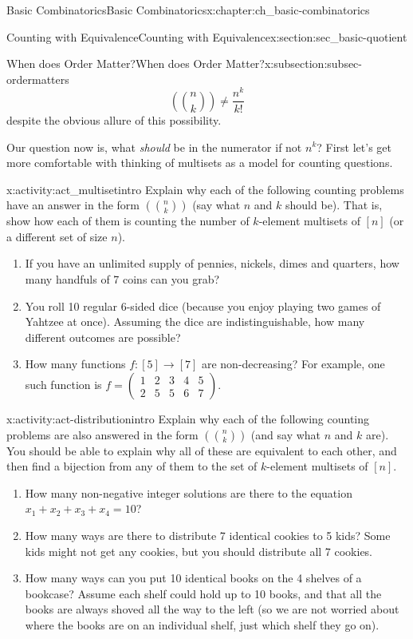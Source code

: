 \documentclass[oneside,10pt,]{book}
\numberwithin{equation}{chapter}
\newcommand{\mchoose}[2]{\left(\!\binom{#1}{#2}\!\right)}
\newcommand{\twoline}[2]{\begin{pmatrix}#1 \\ #2 \end{pmatrix}}
\newcommand{\amp}{&}
\begin{document}
\begin{chapterptx}{Basic Combinatorics}{}{Basic Combinatorics}{}{}{x:chapter:ch_basic-combinatorics}
\begin{sectionptx}{Counting with Equivalence}{}{Counting with Equivalence}{}{}{x:section:sec_basic-quotient}
\begin{subsectionptx}{When does Order Matter?}{}{When does Order Matter?}{}{}{x:subsection:subsec-ordermatters}
\begin{equation*}
\mchoose{n}{k} \ne \frac{n^k}{k!}
\end{equation*}
despite the obvious allure of this possibility.%
\par
Our question now is, what \emph{should} be in the numerator if not \(n^k\)?  First let's get more comfortable with thinking of multisets as a model for counting questions.%
\begin{activity}{}{x:activity:act_multisetintro}%
Explain why each of the following counting problems have an answer in the form \(\mchoose{n}{k}\) (say what \(n\) and \(k\) should be).  That is, show how each of them is counting the number of \(k\)-element multisets of \([n]\) (or a different set of size \(n\)).%
\begin{enumerate}[font=\bfseries,label=(\alph*),ref=\alph*]
\item{}If you have an unlimited supply of pennies, nickels, dimes and quarters, how many handfuls of 7 coins can you grab?%
\item{}You roll 10 regular 6-sided dice (because you enjoy playing two games of Yahtzee at once).  Assuming the dice are indistinguishable, how many different outcomes are possible?%
\item{}How many functions \(f:[5] \to [7]\) are non-decreasing?  For example, one such function is \(f = \twoline{1 \amp 2 \amp 3 \amp 4 \amp 5}{2 \amp 5 \amp 5 \amp 6 \amp 7}\).%
\end{enumerate}
\end{activity}
\begin{activity}{}{x:activity:act-distributionintro}%
Explain why each of the following counting problems are also answered in the form \(\mchoose{n}{k}\) (and say what \(n\) and \(k\) are).  You should be able to explain why all of these are equivalent to each other, and then find a bijection from any of them to the set of \(k\)-element multisets of \([n]\).%
\begin{enumerate}[font=\bfseries,label=(\alph*),ref=\alph*]
\item{}How many non-negative integer solutions are there to the equation \(x_1 + x_2 + x_3 + x_4 = 10\)?%
\item{}How many ways are there to distribute 7 identical cookies to 5 kids? Some kids might not get any cookies, but you should distribute all 7 cookies.%
\item{}How many ways can you put 10 identical books on the 4 shelves of a bookcase?  Assume each shelf could hold up to 10 books, and that all the books are always shoved all the way to the left (so we are not worried about where the books are on an individual shelf, just which shelf they go on).%

\end{enumerate}
\end{activity}
\end{subsectionptx}
\end{sectionptx}
\end{chapterptx}
\end{document}
